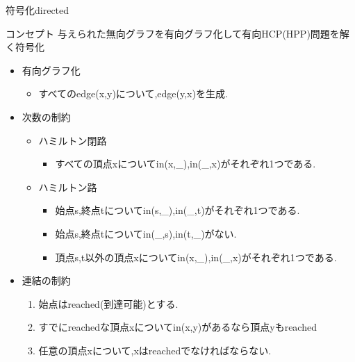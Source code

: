 \documentclass[dvipdfmx,11pt]{beamer}
\begin{document}
\begin{frame}[noframenumbering]{符号化directed}
  \begin{alertblock}{コンセプト}
    与えられた無向グラフを有向グラフ化して有向HCP(HPP)問題を解く符号化
  \end{alertblock}
  \begin{itemize}
  \item \alert{有向グラフ化}
    \begin{itemize}
    \item すべてのedge(x,y)について,edge(y,x)を生成.
    \end{itemize}
  \item \alert{次数の制約}
    \begin{itemize}
    \item ハミルトン閉路
      \begin{itemize}
      \item すべての頂点xについてin(x,\_),in(\_,x)がそれぞれ1つである.
      \end{itemize}
    \item ハミルトン路
      \begin{itemize}
      \item 始点s,終点tについてin(s,\_),in(\_,t)がそれぞれ1つである.
      \item 始点s,終点tについてin(\_,s),in(t,\_)がない.
      \item 頂点s,t以外の頂点xについてin(x,\_),in(\_,x)がそれぞれ1つである.
      \end{itemize}
    \end{itemize}
  \item \alert{連結の制約}
    \begin{enumerate}
    \item 始点はreached(到達可能)とする.
    \item すでにreachedな頂点xについてin(x,y)があるなら頂点yもreached
    \item 任意の頂点xについて,xはreachedでなければならない.
    \end{enumerate}
  \end{itemize}
\end{frame}
\end{document}
